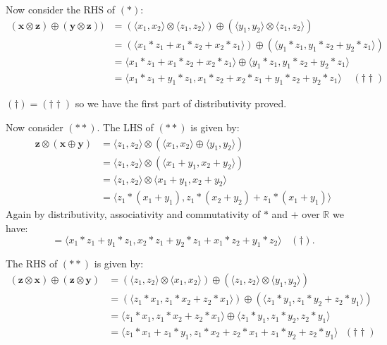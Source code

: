 \documentclass[a4paper]{article}
\begin{document}
Now consider the RHS of $(*)$:
\begin{align*}
          (\bm{x} \otimes \bm{z}) \oplus (\bm{y} \otimes \bm{z})) &=  (\langle x_1, x_2 \rangle \otimes \langle z_1, z_2 \rangle) \oplus (\langle y_1, y_2 \rangle \otimes \langle z_1, z_2 \rangle)\\ 
     &=  (\langle x_1 * z_1 + x_1 * z_2 + x_2 * z_1 \rangle) \oplus (\langle y_1 * z_1, y_1 * z_2 + y_2 * z_1 \rangle)\\ 
     &=  \langle x_1 * z_1 + x_1 * z_2 + x_2 * z_1 \rangle \oplus \langle y_1 * z_1, y_1 * z_2 + y_2 * z_1 \rangle\\ 
     &=  \langle x_1 * z_1 + y_1 * z_1, x_1 * z_2 + x_2 * z_1 + y_1 * z_2 + y_2 * z_1 \rangle ~ ~ ~ ~ ~ (\dag\dag)
\end{align*}

$(\dag) = (\dag\dag)$ so we have the first part of distributivity proved.

Now consider $(**)$.
The LHS of $(**)$ is given by:
\begin{align*}
     \bm{z} \otimes (\bm{x} \oplus \bm{y}) &=  \langle z_1, z_2 \rangle \otimes (\langle x_1, x_2 \rangle \oplus \langle y_1, y_2 \rangle)\\ 
    &=  \langle z_1, z_2 \rangle \otimes (\langle x_1 + y_1, x_2 + y_2 \rangle)\\ 
    &=  \langle z_1, z_2 \rangle \otimes \langle x_1 + y_1, x_2 + y_2 \rangle\\ 
    &=  \langle z_1 * (x_1 + y_1), z_1 * (x_2 + y_2) + z_1 * (x_1 + y_1) \rangle
\end{align*}
Again by distributivity, associativity and commutativity of $*$ and $+$ over $\mathbb{R}$ we have:
\[
= \langle x_1*z_1 + y_1*z_1, x_2*z_1 + y_2*z_1 + x_1*z_2 + y_1*z_2 \rangle ~ ~ ~ ~ (\dag)
.\]

The RHS of $(**)$ is given by:
\begin{align*}
         (\bm{z} \otimes \bm{x}) \oplus (\bm{z} \otimes \bm{y}) &=  (\langle z_1, z_2 \rangle \otimes \langle x_1, x_2 \rangle) \oplus (\langle z_1, z_2 \rangle \otimes \langle y_1, y_2 \rangle)\\ 
    &=  (\langle z_1*x_1, z_1*x_2 + z_2*x_1 \rangle) \oplus (\langle z_1*y_1, z_1*y_2 + z_2*y_1 \rangle)\\ 
    &=  \langle z_1 * x_1, z_1 * x_2 + z_2 * x_1 \rangle \oplus \langle z_1 * y_1, z_1 * y_2, z_2 * y_1 \rangle\\ 
    &=  \langle z_1 * x_1 + z_1 * y_1, z_1 * x_2 + z_2 * x_1 + z_1 * y_2 + z_2 * y_1 \rangle ~ ~ ~ (\dag\dag)
\end{align*}
\end{document}
